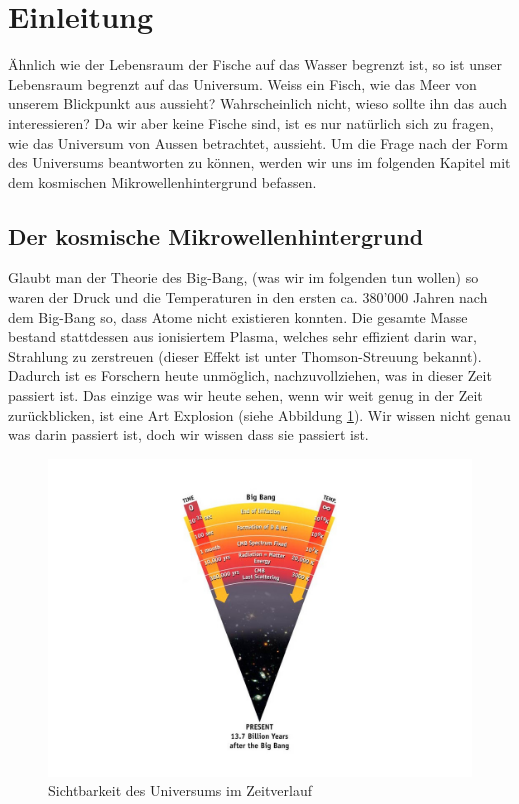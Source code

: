 \section{Einleitung}
Ähnlich wie der Lebensraum der Fische auf das Wasser begrenzt ist, so ist unser 
Lebensraum begrenzt auf das Universum.
Weiss ein Fisch, wie das Meer von unserem Blickpunkt aus aussieht?
Wahrscheinlich nicht, wieso sollte ihn das auch interessieren?
Da wir aber keine Fische sind, ist es nur natürlich sich zu fragen, wie das 
Universum von Aussen betrachtet, aussieht.
Um die Frage nach der Form des Universums beantworten zu können, werden wir uns 
im folgenden Kapitel mit dem kosmischen Mikrowellenhintergrund befassen.

\subsection{Der kosmische Mikrowellenhintergrund}
Glaubt man der Theorie des Big-Bang, (was wir im folgenden tun wollen) so waren 
der Druck und die Temperaturen in den ersten ca. 380'000 Jahren nach dem 
Big-Bang so, dass Atome nicht existieren konnten.
Die gesamte Masse bestand stattdessen aus ionisiertem Plasma, welches sehr 
effizient darin war, Strahlung zu zerstreuen (dieser Effekt ist unter 
Thomson-Streuung bekannt).
Dadurch ist es Forschern heute unmöglich, nachzuvollziehen, was in dieser Zeit 
passiert ist.
Das einzige was wir heute sehen, wenn wir weit genug in der Zeit zurückblicken,
ist eine Art Explosion (siehe Abbildung \ref{fig:radiation_scattering}).
Wir wissen nicht genau was darin passiert ist, doch wir wissen dass sie passiert ist.
\begin{figure}
	\centering
	\includegraphics[width=\linewidth]{cmb/images/radiation_scattering.jpg}
	\caption{Sichtbarkeit des Universums im Zeitverlauf}
	\label{fig:radiation_scattering}
\end{figure}


